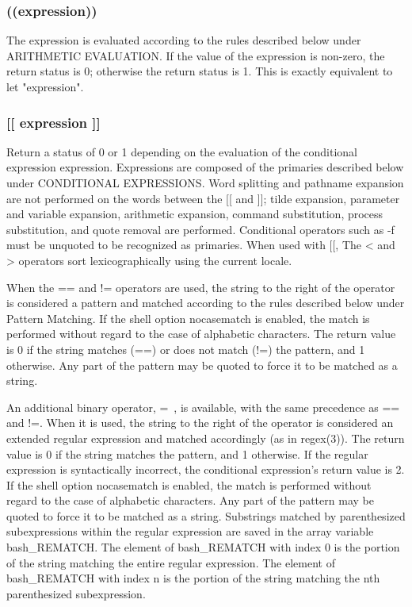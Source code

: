 \documentclass[11pt]{article}
\begin{document}
\subsubsection*{((expression))}
The expression is evaluated according to the rules described below under ARITHMETIC EVALUATION. If the value of the expression is non-zero, the return status is 0; otherwise the return status is 1. This is exactly equivalent to let "expression".
\subsubsection*{[[ expression ]]}
Return a status of 0 or 1 depending on the evaluation of the conditional expression expression. Expressions are composed of the primaries described below under CONDITIONAL EXPRESSIONS. Word splitting and pathname expansion are not performed on the words between the [[ and ]]; tilde expansion, parameter and variable expansion, arithmetic expansion, command substitution, process substitution, and quote removal are performed. Conditional operators such as -f must be unquoted to be recognized as primaries.
When used with [[, The < and > operators sort lexicographically using the current locale.

When the == and != operators are used, the string to the right of the operator is considered a pattern and matched according to the rules described below under Pattern Matching. If the shell option nocasematch is enabled, the match is performed without regard to the case of alphabetic characters. The return value is 0 if the string matches (==) or does not match (!=) the pattern, and 1 otherwise. Any part of the pattern may be quoted to force it to be matched as a string.

An additional binary operator, =~, is available, with the same precedence as == and !=. When it is used, the string to the right of the operator is considered an extended regular expression and matched accordingly (as in regex(3)). The return value is 0 if the string matches the pattern, and 1 otherwise. If the regular expression is syntactically incorrect, the conditional expression's return value is 2. If the shell option nocasematch is enabled, the match is performed without regard to the case of alphabetic characters. Any part of the pattern may be quoted to force it to be matched as a string. Substrings matched by parenthesized subexpressions within the regular expression are saved in the array variable bash\_REMATCH. The element of bash\_REMATCH with index 0 is the portion of the string matching the entire regular expression. The element of bash\_REMATCH with index n is the portion of the string matching the nth parenthesized subexpression.
\end{document}
